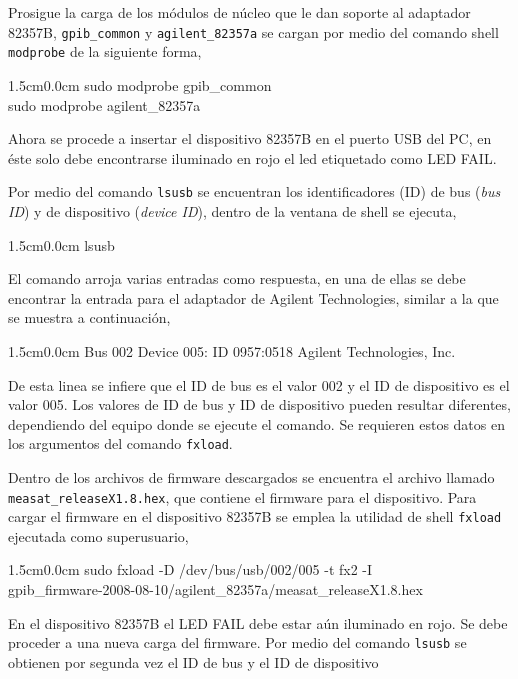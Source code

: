 \documentclass[paper=letter,oneside,fontsize=11pt, parskip=full]{scrartcl}
\newenvironment{code}
	{\begin{adjustwidth}{1.5cm}{0.0cm}\ttfamily}
	{\end{adjustwidth}}
\begin{document}
		Prosigue la carga de los módulos de núcleo que le dan soporte al adaptador 82357B, \texttt{gpib\_common} y \texttt{agilent\_82357a} se cargan por medio del comando shell \texttt{modprobe} de la siguiente forma,
		
		\begin{code}
			sudo modprobe gpib\_common \\		
			sudo modprobe agilent\_82357a
		\end{code}
		
		Ahora se procede a insertar el dispositivo 82357B en el puerto USB del PC, en éste solo debe encontrarse iluminado en rojo el led etiquetado como LED FAIL. 
		
		Por medio del comando \texttt{lsusb} se encuentran los identificadores (ID) de bus (\emph{bus ID}) y de dispositivo (\emph{device ID}), dentro de la ventana de shell se ejecuta,
		
		\begin{code}
			lsusb
		\end{code}
		
		El comando arroja varias entradas como respuesta, en una de ellas se debe encontrar la entrada para el adaptador de Agilent Technologies, similar a la que se muestra a continuación,
	
		\begin{code}
			Bus 002 Device 005: ID 0957:0518 Agilent Technologies, Inc.
		\end{code}
		
		De esta linea se infiere que el ID de bus es el valor 002 y el ID de dispositivo es el valor 005. Los valores de ID de bus y ID de dispositivo pueden resultar diferentes, dependiendo del equipo donde se ejecute el comando. Se requieren estos datos en los argumentos del comando \texttt{fxload}.
		
		Dentro de los archivos de firmware descargados se encuentra el archivo llamado \texttt{measat\_releaseX1.8.hex}, que contiene el firmware para el dispositivo. Para cargar el firmware en el dispositivo 82357B se emplea la utilidad de shell \texttt{fxload} ejecutada como superusuario, 
		
		\begin{code}
			sudo fxload -D /dev/bus/usb/002/005  -t fx2 -I \\ gpib\_firmware-2008-08-10/agilent\_82357a/measat\_releaseX1.8.hex
		\end{code}
		
		En el dispositivo 82357B el LED FAIL debe estar aún iluminado en rojo. Se debe proceder a una nueva carga del firmware. Por medio del comando \texttt{lsusb} se obtienen por segunda vez el ID de bus y el ID de dispositivo
		
\end{document}
